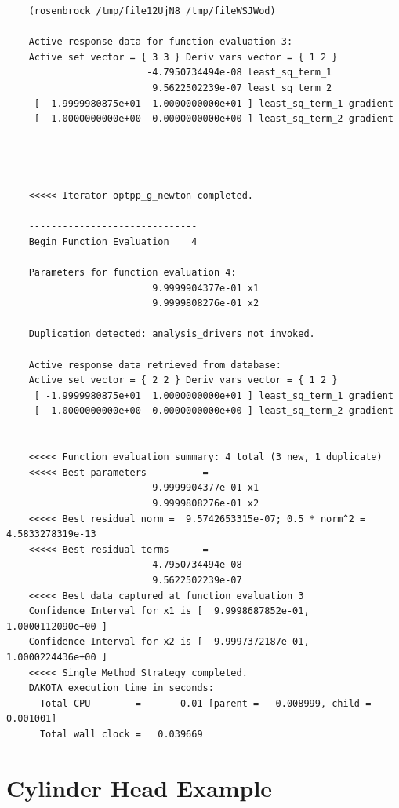 \begin{small}
\begin{verbatim}
    (rosenbrock /tmp/file12UjN8 /tmp/fileWSJWod)
    
    Active response data for function evaluation 3:
    Active set vector = { 3 3 } Deriv vars vector = { 1 2 }
                         -4.7950734494e-08 least_sq_term_1
                          9.5622502239e-07 least_sq_term_2
     [ -1.9999980875e+01  1.0000000000e+01 ] least_sq_term_1 gradient
     [ -1.0000000000e+00  0.0000000000e+00 ] least_sq_term_2 gradient
    
    
    
    
    <<<<< Iterator optpp_g_newton completed.
    
    ------------------------------
    Begin Function Evaluation    4
    ------------------------------
    Parameters for function evaluation 4:
                          9.9999904377e-01 x1
                          9.9999808276e-01 x2
    
    Duplication detected: analysis_drivers not invoked.
    
    Active response data retrieved from database:
    Active set vector = { 2 2 } Deriv vars vector = { 1 2 }
     [ -1.9999980875e+01  1.0000000000e+01 ] least_sq_term_1 gradient
     [ -1.0000000000e+00  0.0000000000e+00 ] least_sq_term_2 gradient
    
    
    <<<<< Function evaluation summary: 4 total (3 new, 1 duplicate)
    <<<<< Best parameters          =
                          9.9999904377e-01 x1
                          9.9999808276e-01 x2
    <<<<< Best residual norm =  9.5742653315e-07; 0.5 * norm^2 =  4.5833278319e-13
    <<<<< Best residual terms      =
                         -4.7950734494e-08
                          9.5622502239e-07
    <<<<< Best data captured at function evaluation 3
    Confidence Interval for x1 is [  9.9998687852e-01,  1.0000112090e+00 ]
    Confidence Interval for x2 is [  9.9997372187e-01,  1.0000224436e+00 ]
    <<<<< Single Method Strategy completed.
    DAKOTA execution time in seconds:
      Total CPU        =       0.01 [parent =   0.008999, child =   0.001001]
      Total wall clock =   0.039669
\end{verbatim}
\end{small}

\section{Cylinder Head Example}\label{additional:cylinder}

